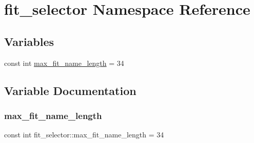 \hypertarget{namespacefit__selector}{}\section{fit\+\_\+selector Namespace Reference}
\label{namespacefit__selector}
\subsection*{Variables}
\begin{DoxyCompactItemize}
\item 
const int \mbox{\hyperlink{namespacefit__selector_a69c3c6f56fed4c313ef02d1385c99667}{max\+\_\+fit\+\_\+name\+\_\+length}} = 34
\end{DoxyCompactItemize}


\subsection{Variable Documentation}
\mbox{\label{namespacefit__selector_a69c3c6f56fed4c313ef02d1385c99667}} 
\subsubsection{\texorpdfstring{max\_fit\_name\_length}{max\_fit\_name\_length}}
{\footnotesize\ttfamily const int fit\+\_\+selector\+::max\+\_\+fit\+\_\+name\+\_\+length = 34}

